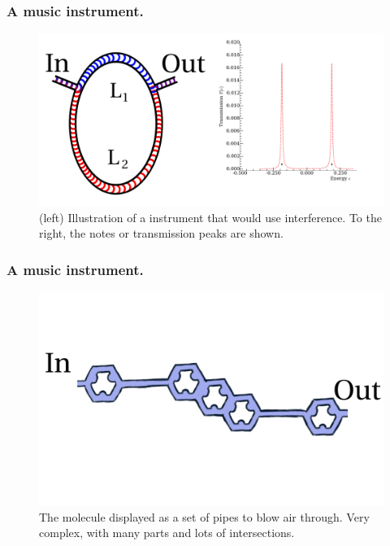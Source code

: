 \begin{frame}
    \frametitle{A music instrument.}
    \begin{figure}[!b] 
        \centering
        \includegraphics[height=0.5\textheight]{fig/acoustic.pdf}
        \caption{(left) Illustration of a instrument that would use interference. To the right, the notes or transmission peaks are shown.}
    \end{figure} 
\end{frame}%
\begin{frame}
    \frametitle{A music instrument.}
    \begin{figure}[!b] 
        \centering
        \includegraphics[height=0.5\textheight]{fig/molecule.pdf}
        \caption{The molecule displayed as a set of pipes to blow air through. Very complex, with many parts and lots of intersections.}
    \end{figure} 
\end{frame}%
